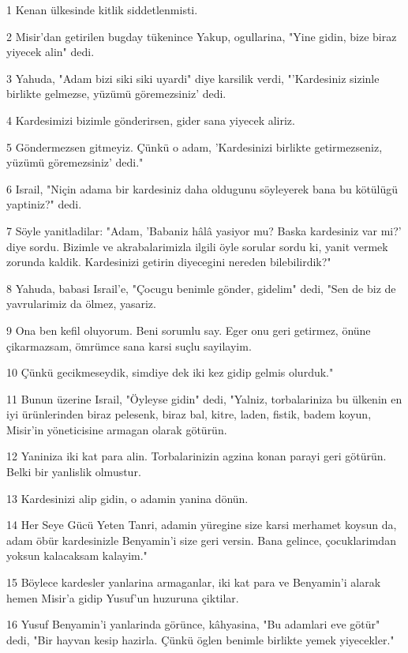 \par 1 Kenan ülkesinde kitlik siddetlenmisti.
\par 2 Misir'dan getirilen bugday tükenince Yakup, ogullarina, "Yine gidin, bize biraz yiyecek alin" dedi.
\par 3 Yahuda, "Adam bizi siki siki uyardi" diye karsilik verdi, "'Kardesiniz sizinle birlikte gelmezse, yüzümü göremezsiniz' dedi.
\par 4 Kardesimizi bizimle gönderirsen, gider sana yiyecek aliriz.
\par 5 Göndermezsen gitmeyiz. Çünkü o adam, 'Kardesinizi birlikte getirmezseniz, yüzümü göremezsiniz' dedi."
\par 6 Israil, "Niçin adama bir kardesiniz daha oldugunu söyleyerek bana bu kötülügü yaptiniz?" dedi.
\par 7 Söyle yanitladilar: "Adam, 'Babaniz hâlâ yasiyor mu? Baska kardesiniz var mi?' diye sordu. Bizimle ve akrabalarimizla ilgili öyle sorular sordu ki, yanit vermek zorunda kaldik. Kardesinizi getirin diyecegini nereden bilebilirdik?"
\par 8 Yahuda, babasi Israil'e, "Çocugu benimle gönder, gidelim" dedi, "Sen de biz de yavrularimiz da ölmez, yasariz.
\par 9 Ona ben kefil oluyorum. Beni sorumlu say. Eger onu geri getirmez, önüne çikarmazsam, ömrümce sana karsi suçlu sayilayim.
\par 10 Çünkü gecikmeseydik, simdiye dek iki kez gidip gelmis olurduk."
\par 11 Bunun üzerine Israil, "Öyleyse gidin" dedi, "Yalniz, torbalariniza bu ülkenin en iyi ürünlerinden biraz pelesenk, biraz bal, kitre, laden, fistik, badem koyun, Misir'in yöneticisine armagan olarak götürün.
\par 12 Yaniniza iki kat para alin. Torbalarinizin agzina konan parayi geri götürün. Belki bir yanlislik olmustur.
\par 13 Kardesinizi alip gidin, o adamin yanina dönün.
\par 14 Her Seye Gücü Yeten Tanri, adamin yüregine size karsi merhamet koysun da, adam öbür kardesinizle Benyamin'i size geri versin. Bana gelince, çocuklarimdan yoksun kalacaksam kalayim."
\par 15 Böylece kardesler yanlarina armaganlar, iki kat para ve Benyamin'i alarak hemen Misir'a gidip Yusuf'un huzuruna çiktilar.
\par 16 Yusuf Benyamin'i yanlarinda görünce, kâhyasina, "Bu adamlari eve götür" dedi, "Bir hayvan kesip hazirla. Çünkü öglen benimle birlikte yemek yiyecekler."
